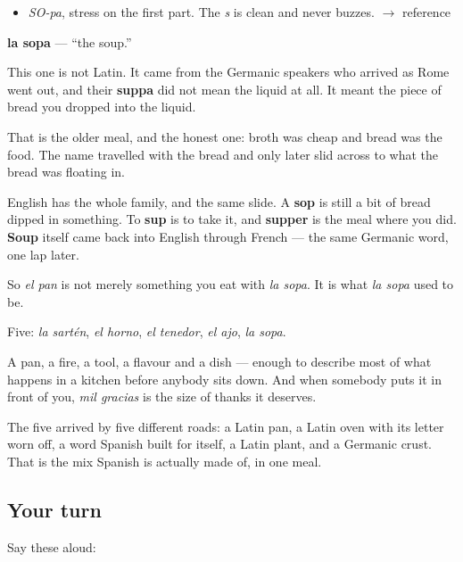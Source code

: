 \begin{sounds}
\begin{itemize}
\raggedright
  \item \emph{SO-pa}, stress on the first part. The \emph{s} is clean and never buzzes. $\to$ reference
\end{itemize}
\end{sounds}

\begin{cousinweb}
\textbf{la sopa} — \textquotedblleft{}the soup.\textquotedblright{}

This one is not Latin. It came from the Germanic speakers who arrived as Rome went out, and their \textbf{suppa} did not mean the liquid at all. It meant the piece of bread you dropped into the liquid.

That is the older meal, and the honest one: broth was cheap and bread was the food. The name travelled with the bread and only later slid across to what the bread was floating in.

English has the whole family, and the same slide. A \textbf{sop} is still a bit of bread dipped in something. To \textbf{sup} is to take it, and \textbf{supper} is the meal where you did. \textbf{Soup} itself came back into English through French — the same Germanic word, one lap later.

So \emph{el pan} is not merely something you eat with \emph{la sopa}. It is what \emph{la sopa} used to be.
\end{cousinweb}

\begin{grammarlens}[title={What you've built}]
Five: \emph{la sartén}, \emph{el horno}, \emph{el tenedor}, \emph{el ajo}, \emph{la sopa}.

A pan, a fire, a tool, a flavour and a dish — enough to describe most of what happens in a kitchen before anybody sits down. And when somebody puts it in front of you, \emph{mil gracias} is the size of thanks it deserves.

The five arrived by five different roads: a Latin pan, a Latin oven with its letter worn off, a word Spanish built for itself, a Latin plant, and a Germanic crust. That is the mix Spanish is actually made of, in one meal.
\end{grammarlens}

\subsection*{Your turn}
Say these aloud:

